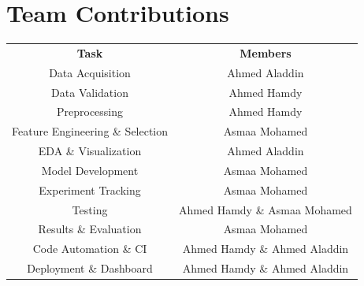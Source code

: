 \documentclass[12pt, a4paper]{article}
\begin{document}
\section*{Team Contributions}
\begin{center}
\renewcommand{\arraystretch}{1.6}
\begin{tabular}{c  c}
  \rowcolor{teal}
  {\color{white}\small\bfseries Task} &
  {\color{white}\small\bfseries Members} \\
  \rowcolor{lightgray}
  Data Acquisition & Ahmed Aladdin  \\
  \rowcolor{white}
  Data Validation & Ahmed Hamdy \\
  \rowcolor{lightgray}
  Preprocessing & Ahmed Hamdy \\
  \rowcolor{white}
  Feature Engineering \& Selection & Asmaa Mohamed \\
  \rowcolor{lightgray}
  EDA \& Visualization & Ahmed Aladdin  \\
  \rowcolor{white}
  Model Development & Asmaa Mohamed \\
  \rowcolor{lightgray}
  Experiment Tracking & Asmaa Mohamed \\
  \rowcolor{white}
  Testing & Ahmed Hamdy \& Asmaa Mohamed \\
  \rowcolor{lightgray}
  Results \& Evaluation & Asmaa Mohamed \\
  \rowcolor{white}
  Code Automation \& CI & Ahmed Hamdy \& Ahmed Aladdin \\
  \rowcolor{lightgray}
  Deployment \& Dashboard & Ahmed Hamdy \& Ahmed Aladdin \\
\end{tabular}
\end{center}
\end{document}
